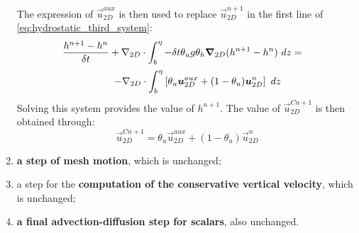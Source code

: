 \begin{enumerate}
The expression of $\vec{u}_{2D}^{aux}$ is then used to replace $\vec{u}_{2D}^{n+1}$
in the first line of \eqref{eq:hydrostatic_third_system}:
\begin{equation}
  \begin{array}{ll}
    \dfrac{h^{n+1}-h^{n}}{\delta t}+ \nabla_{2D}\cdot \displaystyle{\int_b^\eta
      -\delta t\theta_u
            g \theta_h \Grad_{2D}(h^{n+1}-h^n) 
      ~dz}= &\medskip \\

     & \hspace{-7cm}-\nabla_{2D}\cdot \displaystyle{\int_b^\eta
      \left[\theta_u\vec{u}_{2D}^{aux}+(1-\theta_u)\vec{u}_{2D}^n\right]~dz}
  \end{array}
\label{eq:wave_equation_time2}
\end{equation}
Solving this system provides the value of $h^{n+1}$. The value of $\vec{u}_{2D}^{Cn+1}$ is then obtained through:
\begin{equation}
\vec{u}_{2D}^{Cn+1}=\theta_u\vec{u}_{2D}^{aux}+(1-\theta_u)\vec{u}_{2D}^n
\end{equation}

\item \textbf{a step of mesh motion}, which is unchanged;

\item a step for the \textbf{computation of the conservative vertical velocity},
which is unchanged;
\item \textbf{a final advection-diffusion step for scalars}, also unchanged.
\end{enumerate}

